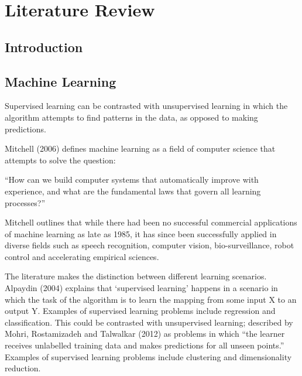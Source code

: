 
\chapter{Literature Review} %

\label{Chapter2} %



\section{Introduction}
\section{Machine Learning}

Supervised learning can be contrasted with unsupervised learning in which the algorithm attempts to find patterns in the data, as opposed to making predictions.

Mitchell (2006) defines machine learning as a field of computer science that attempts to solve the question:

“How can we build computer systems that automatically improve with experience, and what
are the fundamental laws that govern all learning processes?”

Mitchell outlines that while there had been no successful commercial applications of machine learning as late as 1985, it has since been successfully applied in diverse fields such as speech recognition, computer vision, bio-surveillance, robot control and accelerating empirical sciences.

The literature makes the distinction between different learning scenarios. Alpaydin (2004) explains that ‘supervised learning’ happens in a scenario in which the task of the algorithm is to learn the mapping from some input X to an output Y. Examples of supervised learning problems include regression and classification. This could be contrasted with unsupervised learning; described by Mohri, Rostamizadeh and Talwalkar (2012) as problems in which “the learner receives unlabelled training data and makes predictions for all unseen points.” Examples of supervised learning problems include clustering and dimensionality reduction.


